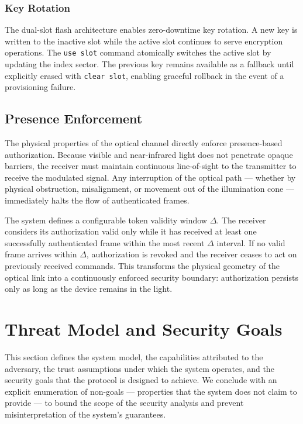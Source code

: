 \documentclass[conference]{IEEEtran}
\begin{document}
\subsubsection{Key Rotation}

The dual-slot flash architecture enables zero-downtime key rotation. A new key is written to the inactive slot while the active slot continues to serve encryption operations. The \texttt{use slot} command atomically switches the active slot by updating the index sector. The previous key remains available as a fallback until explicitly erased with \texttt{clear slot}, enabling graceful rollback in the event of a provisioning failure.

\subsection{Presence Enforcement}

The physical properties of the optical channel directly enforce presence-based authorization. Because visible and near-infrared light does not penetrate opaque barriers, the receiver must maintain continuous line-of-sight to the transmitter to receive the modulated signal. Any interruption of the optical path --- whether by physical obstruction, misalignment, or movement out of the illumination cone --- immediately halts the flow of authenticated frames.

The system defines a configurable token validity window $\Delta$. The receiver considers its authorization valid only while it has received at least one successfully authenticated frame within the most recent $\Delta$ interval. If no valid frame arrives within $\Delta$, authorization is revoked and the receiver ceases to act on previously received commands. This transforms the physical geometry of the optical link into a continuously enforced security boundary: authorization persists only as long as the device remains in the light.

\section{Threat Model and Security Goals}
\label{sec:threat-model}

This section defines the system model, the capabilities attributed to the adversary, the trust assumptions under which the system operates, and the security goals that the protocol is designed to achieve. We conclude with an explicit enumeration of non-goals — properties that the system does not claim to provide — to bound the scope of the security analysis and prevent misinterpretation of the system's guarantees.
\end{document}
